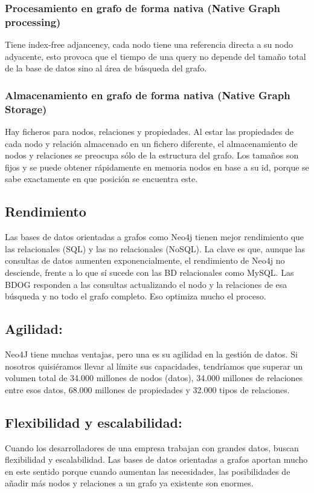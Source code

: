\subsubsection{Procesamiento en grafo de forma nativa (Native Graph processing)}
    Tiene index-free adjancency, cada nodo tiene una referencia directa a su nodo adyacente, esto provoca    que el tiempo de una query no depende del tamaño total de la base de datos sino al área de búsqueda del grafo.
\subsubsection{Almacenamiento en grafo de forma nativa (Native Graph Storage)}
 	Hay ficheros para nodos, relaciones y propiedades. Al estar las propiedades de cada nodo y relación almacenado en un fichero diferente, el almacenamiento de nodos y relaciones se preocupa sólo de la estructura del grafo. Los tamaños son fijos y se puede obtener rápidamente en memoria nodos en base a su id, porque se sabe exactamente en que posición se encuentra este.
\newpage
 \subsection{Rendimiento}
	 Las bases de datos orientadas a grafos como Neo4j tienen mejor rendimiento que las relacionales (SQL) y las no relacionales (NoSQL). La clave es que, aunque las consultas de datos aumenten exponencialmente, el rendimiento de Neo4j no desciende, frente a lo que sí sucede con las BD relacionales como MySQL.
 	 Las BDOG responden a las consultas actualizando el nodo y la relaciones de esa búsqueda y no todo el grafo completo. Eso optimiza mucho el proceso.
\subsection{ Agilidad:}
	 Neo4J tiene muchas ventajas, pero una es su agilidad en la gestión de datos. Si nosotros quisiéramos llevar al límite sus capacidades, tendríamos que superar un volumen total de 34.000 millones de nodos (datos), 34.000 millones de relaciones entre esos datos, 68.000 millones de propiedades y 32.000 tipos de relaciones. 
\subsection{Flexibilidad y escalabilidad:}
 	 Cuando los desarrolladores de una empresa trabajan con grandes datos, buscan flexibilidad y escalabilidad. Las bases de datos orientadas a grafos aportan mucho en este sentido porque cuando aumentan las necesidades, las posibilidades de añadir más nodos y relaciones a un grafo ya existente son enormes.

